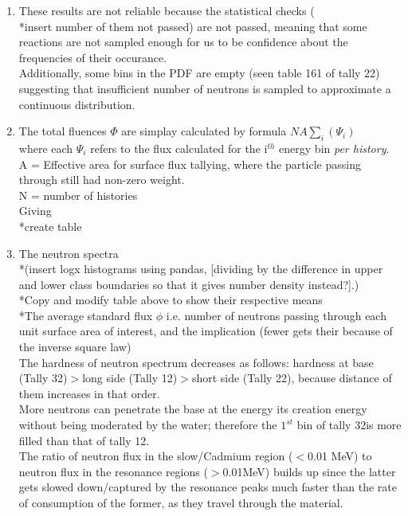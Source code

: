 \documentclass[a4paper, 12pt]{article}
\begin{document}
\begin{enumerate}
	\item These results are not reliable because the statistical checks (\\*insert number of them not passed) are not passed, meaning that some reactions are not sampled enough for us to be confidence about the frequencies of their occurance.
	\\Additionally, some bins in the PDF are empty (seen table 161 of tally 22) suggesting that insufficient number of neutrons is sampled to approximate a continuous distribution.
	\item The total fluences $\Phi$ are simplay calculated by formula $N A \sum_i (\Psi_i)$ 
		\\where each $\Psi_i$ refers to the flux calculated for the i${}^{th}$ energy bin \emph{per history}.
		\\      A = Effective area for surface flux tallying, where the particle passing through still had non-zero weight.
		\\      N = number of histories
		\\Giving \\*create table
	\item The neutron spectra 
	\\*(insert logx histograms using pandas, [dividing by the difference in upper and lower class boundaries so that it gives number density instead?].)
	\\*Copy and modify table above to show their respective means
	\\*The average standard flux $\phi$ i.e. number of neutrons passing through each unit surface area of interest, and the implication (fewer gets their because of the inverse square law)
	\\The hardness of neutron spectrum decreases as follows: hardness at base (Tally 32)$>$long side (Tally 12)$>$short side (Tally 22), because distance of them increases in that order.
	\\More neutrons can penetrate the base at the energy its creation energy without being moderated by the water; therefore the $1^{st}$ bin of tally 32is more filled than that of tally 12. 
	\\The ratio of neutron flux in the slow/Cadmium region ($<$0.01 MeV) to neutron flux in the resonance regions ($>$0.01MeV) builds up since the latter gets slowed down/captured by the resonance peaks much faster than the rate of consumption of the former, as they travel through the material.
\end{enumerate}
\end{document}
